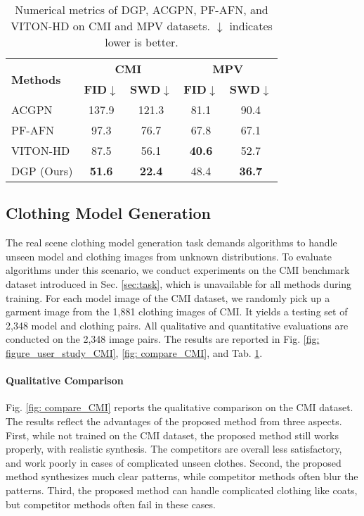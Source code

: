 \documentclass[10pt,twocolumn,letterpaper]{article}
\newcommand{\FID}{\textbf{FID$\downarrow$}}  \newcommand{\PPL}{\textbf{PPL$\downarrow$}}  \newcommand{\SSIM}{\textbf{SSIM$\downarrow$}}  \newcommand{\SWD}{\textbf{SWD$\downarrow$}}
\begin{document}
\begin{table}[t]
\caption{
    Numerical metrics of DGP, ACGPN, PF-AFN, and VITON-HD on CMI and MPV datasets. $\downarrow$ indicates lower is better.
  }\label{tab:metrics}
  \centering
  \begin{tabular}{lcccc}
		\toprule
		\multirow{2}{*}{\textbf{Methods}} & \multicolumn{2}{c}{\textbf{CMI}} & \multicolumn{2}{c}{\textbf{MPV}} \\
		 \cmidrule(lr){2-3}\cmidrule(lr){4-5}& \FID & \SWD & \FID & \SWD\\
		\midrule
ACGPN&137.9 &121.3&81.1 &90.4\\
		PF-AFN &97.3&76.7&67.8&67.1\\
		VITON-HD &87.5&56.1&\textbf{40.6}&52.7\\
		DGP (Ours) &\textbf{51.6}&\textbf{22.4}&48.4&\textbf{36.7}\\


\bottomrule
	\end{tabular} \end{table}



\subsection{Clothing Model Generation}\label{sec:CMI}
The real scene clothing model generation task demands algorithms to handle unseen model and clothing images from unknown distributions. To evaluate algorithms under this scenario, we conduct experiments on the CMI benchmark dataset introduced in Sec. \ref{sec:task}, which is unavailable for all methods during training. For each model image of the CMI dataset, we randomly pick up a garment image from the 1,881 clothing images of CMI. It yields a testing set of 2,348 model and clothing pairs. All qualitative and quantitative evaluations are conducted on the 2,348 image pairs. The results are reported in Fig. \ref{fig: figure_user_study_CMI}, \ref{fig: compare_CMI}, and  Tab. \ref{tab:metrics}.


\paragraph{Qualitative Comparison} Fig. \ref{fig: compare_CMI} reports the qualitative comparison on the CMI dataset. The results reflect the advantages of the proposed method from three aspects. First, while not trained on the CMI dataset, the proposed method still works properly, with realistic synthesis. The competitors are overall less satisfactory, and work poorly in cases of complicated unseen clothes. Second, the proposed method synthesizes much clear patterns, while competitor methods often blur the patterns. Third, the proposed method can handle complicated clothing like coats, but competitor methods often fail in these cases.
\end{document}
